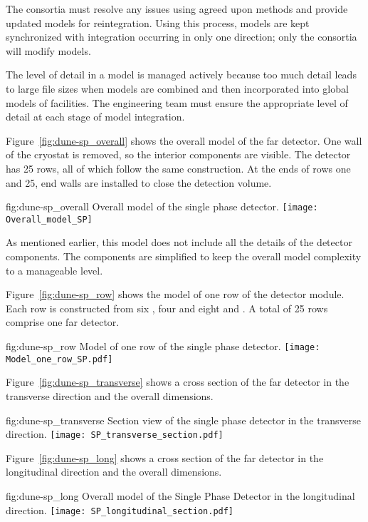 The consortia must resolve any issues using agreed upon methods and
provide updated models for reintegration. Using this process, models
are kept synchronized with integration occurring in only one
direction; only the consortia will modify models.


The level of detail in a model is managed actively because too much detail leads to large file sizes when models are combined and
then incorporated into global models of facilities. The  engineering team must ensure the
appropriate level of detail at each stage of model
integration.


Figure~\ref{fig:dune-sp_overall} shows the overall model of the  far detector. One wall of the cryostat is removed, so the interior
components are visible. The detector has 25 rows, all of which follow
the same construction. At the ends of rows one and 25, end
walls are installed to close the detection volume.
\begin{dunefigure}{fig:dune-sp_overall}
  {Overall model of the single phase detector.}
  \texttt{[image: Overall\_model\_SP]}
\end{dunefigure}
As mentioned earlier, this model does not include all the details of
the detector components. The components are simplified to keep the
overall model complexity to a manageable level.


Figure~\ref{fig:dune-sp_row} shows the model of one row of the
detector module. Each row is constructed from six , four
 and eight  and . A total of 25 rows
comprise one  far detector.
\begin{dunefigure}{fig:dune-sp_row}
  {Model of one row of the single phase detector.}
  \texttt{[image: Model\_one\_row\_SP.pdf]}
\end{dunefigure}




Figure~\ref{fig:dune-sp_transverse} shows a cross section of the
 far detector in the transverse direction and the overall
dimensions.
\begin{dunefigure}{fig:dune-sp_transverse}
  {Section view of the single phase detector in the transverse
    direction.}
  \texttt{[image: SP\_transverse\_section.pdf]}
\end{dunefigure}
Figure~\ref{fig:dune-sp_long} shows a cross section of the
 far detector in the longitudinal direction and the overall
dimensions.
\begin{dunefigure}{fig:dune-sp_long}
  {Overall model of the Single Phase Detector in the longitudinal direction.}
  \texttt{[image: SP\_longitudinal\_section.pdf]}
\end{dunefigure}


